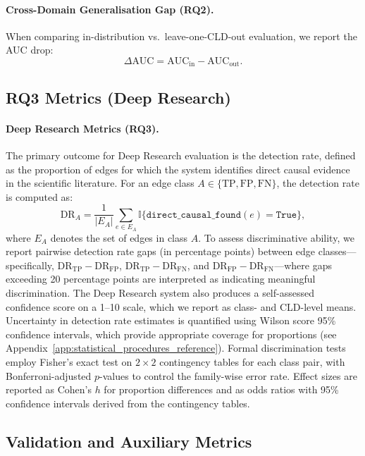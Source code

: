 \paragraph{Cross-Domain Generalisation Gap (RQ2).}
When comparing in-distribution vs.\ leave-one-CLD-out evaluation, we report the AUC drop:
\begin{equation}
    \Delta \text{AUC} = \text{AUC}_{\text{in}} - \text{AUC}_{\text{out}}.
\end{equation}

\subsection{RQ3 Metrics (Deep Research)}

\paragraph{Deep Research Metrics (RQ3).}
The primary outcome for Deep Research evaluation is the detection rate, defined as the proportion of edges for which the system identifies direct causal evidence in the scientific literature. For an edge class $A\in\{\text{TP},\text{FP},\text{FN}\}$, the detection rate is computed as:
\[
\text{DR}_{A}=\frac{1}{|E_A|}\sum_{e\in E_A}\mathbb{I}\{\texttt{direct\_causal\_found}(e)=\texttt{True}\},
\]
where $E_A$ denotes the set of edges in class $A$. To assess discriminative ability, we report pairwise detection rate gaps (in percentage points) between edge classes---specifically, $\text{DR}_{\text{TP}} - \text{DR}_{\text{FP}}$, $\text{DR}_{\text{TP}} - \text{DR}_{\text{FN}}$, and $\text{DR}_{\text{FP}} - \text{DR}_{\text{FN}}$---where gaps exceeding 20 percentage points are interpreted as indicating meaningful discrimination. The Deep Research system also produces a self-assessed confidence score on a 1--10 scale, which we report as class- and CLD-level means. Uncertainty in detection rate estimates is quantified using Wilson score 95\% confidence intervals, which provide appropriate coverage for proportions (see Appendix~\ref{app:statistical_procedures_reference}). Formal discrimination tests employ Fisher's exact test on $2\times2$ contingency tables for each class pair, with Bonferroni-adjusted $p$-values to control the family-wise error rate. Effect sizes are reported as Cohen's $h$ for proportion differences and as odds ratios with 95\% confidence intervals derived from the contingency tables.

\subsection{Validation and Auxiliary Metrics}

